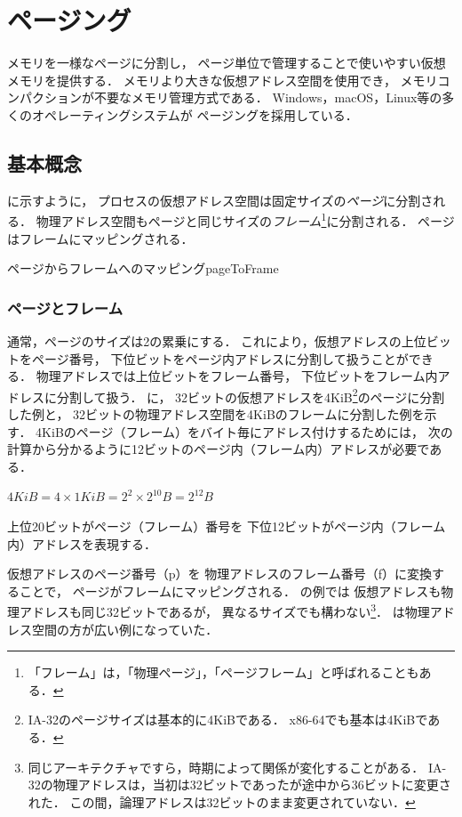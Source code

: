 \chapter{ページング}
\label{chap:paging}
% 
メモリを一様なページに分割し，
ページ単位で管理することで使いやすい仮想メモリを提供する．
メモリより大きな仮想アドレス空間を使用でき，
メモリコンパクションが不要なメモリ管理方式である．
Windows，macOS，Linux等の多くのオペレーティングシステムが
ページングを採用している．

\section{基本概念}
に示すように，
プロセスの仮想アドレス空間は固定サイズの\emph{ページ}に分割される．
物理アドレス空間もページと同じサイズの\emph{フレーム}\footnote{
「フレーム」は，「物理ページ」，「ページフレーム」と呼ばれることもある．
}に分割される．
ページはフレームにマッピングされる．

{ページからフレームへのマッピング}{pageToFrame}

\subsection{ページとフレーム}
通常，ページのサイズは2の累乗にする．
これにより，仮想アドレスの上位ビットをページ番号，
下位ビットをページ内アドレスに分割して扱うことができる．
物理アドレスでは上位ビットをフレーム番号，
下位ビットをフレーム内アドレスに分割して扱う．
に，
32ビットの仮想アドレスを4KiB\footnote{
IA-32のページサイズは基本的に4KiBである．
x86-64でも基本は4KiBである．}のページに分割した例と，
32ビットの物理アドレス空間を4KiBのフレームに分割した例を示す．
4KiBのページ（フレーム）をバイト毎にアドレス付けするためには，
次の計算から分かるように12ビットのページ内（フレーム内）アドレスが必要である．
\centerline{$4KiB = 4 \times 1KiB = 2^2 \times 2^{10}B = 2^{12}B$}
上位20ビットがページ（フレーム）番号を
下位12ビットがページ内（フレーム内）アドレスを表現する．

仮想アドレスのページ番号（p）を
物理アドレスのフレーム番号（f）に変換することで，
ページがフレームにマッピングされる．
の例では
仮想アドレスも物理アドレスも同じ32ビットであるが，
異なるサイズでも構わない\footnote{
同じアーキテクチャですら，時期によって関係が変化することがある．
IA-32の物理アドレスは，当初は32ビットであったが途中から36ビットに変更された．
この間，論理アドレスは32ビットのまま変更されていない．}．
は物理アドレス空間の方が広い例になっていた．

